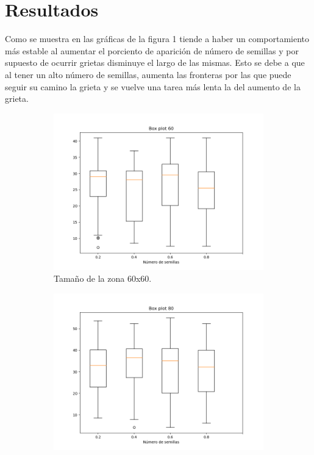 \documentclass{article}
\begin{document}
\section{Resultados}
Como se muestra en las gráficas de la figura 1 tiende a haber un comportamiento más estable al aumentar el porciento de aparición de número de semillas y por supuesto de ocurrir grietas disminuye el largo de las mismas. Esto se debe a que al tener un alto número de semillas, aumenta las fronteras por las que puede seguir su camino la grieta y se vuelve una tarea más lenta la del aumento de la grieta.

\begin{figure}
	\centering
	\begin{subfigure}[b]{0.45\linewidth}
		\includegraphics[width=\linewidth]{Fig60.png}
		\caption{Tamaño de la zona 60x60.}
		\label{60}
	\end{subfigure}
		\begin{subfigure}[b]{0.45\linewidth}
		\includegraphics[width=\linewidth]{Fig80.png}

\end{subfigure}
\end{figure}
\end{document}
